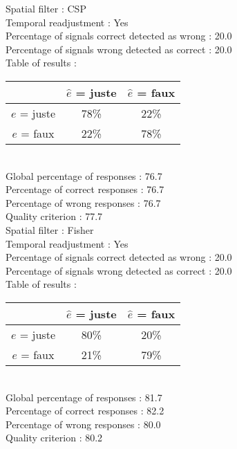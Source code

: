 Spatial filter : CSP \\
Temporal readjustment : Yes \\
Percentage of signals correct detected as wrong :   20.0 \\
Percentage of signals wrong detected as correct :   20.0 \\
Table of results : \\
\begin{tabular}{|c|c|c|}
\hline				& $\hat{e}$ = juste & $\hat{e}$ = faux \\
\hline  $e$ = juste	&     78\%			&     22\%		\\
\hline  $e$ = faux	&     22\%			&     78\%		\\
\hline
\end{tabular}\\
Global percentage of responses :   76.7 \\
Percentage of correct responses :   76.7 \\
Percentage of wrong responses :   76.7 \\
Quality criterion :   77.7 \\

Spatial filter : Fisher \\
Temporal readjustment : Yes \\
Percentage of signals correct detected as wrong :   20.0 \\
Percentage of signals wrong detected as correct :   20.0 \\
Table of results : \\
\begin{tabular}{|c|c|c|}
\hline				& $\hat{e}$ = juste & $\hat{e}$ = faux \\
\hline  $e$ = juste	&     80\%			&     20\%		\\
\hline  $e$ = faux	&     21\%			&     79\%		\\
\hline
\end{tabular}\\
Global percentage of responses :   81.7 \\
Percentage of correct responses :   82.2 \\
Percentage of wrong responses :   80.0 \\
Quality criterion :   80.2 \\

\newpage
